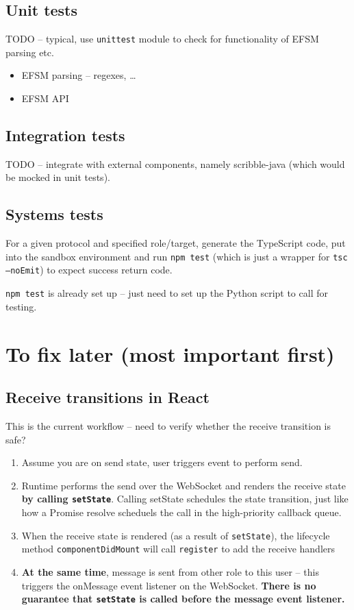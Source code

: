 \documentclass{article}
\begin{document}
\subsection{Unit tests}
TODO -- typical, use \texttt{unittest} module
to check for functionality of EFSM parsing
etc.

\begin{itemize}
\item EFSM parsing -- regexes, \dots
\item EFSM API
\end{itemize}

\subsection{Integration tests}
TODO -- integrate with external components, namely
scribble-java (which would be mocked in unit tests).

\subsection{Systems tests}
For a given protocol and specified role/target,
generate the TypeScript code, put into the
sandbox environment and run \texttt{npm test} 
(which is just a wrapper for 
\texttt{tsc --noEmit})
to expect success return code.

\texttt{npm test} is already set up -- just need to
set up the Python script to call for testing.

\section{To fix later (most important first)}

\subsection*{Receive transitions in React}
This is the current workflow -- need to verify whether the receive transition is safe?

\begin{enumerate}
\item
Assume you are on send state, user triggers
event to perform send.
\item
Runtime performs the send over the WebSocket
and renders the receive state \textbf{by
calling \texttt{setState}}. Calling setState 
schedules the state transition, just like
how a Promise resolve scheduels the call in
the high-priority callback queue.

\item When the receive state is rendered (as a 
result of \texttt{setState}), the lifecycle
method \texttt{componentDidMount} will call \texttt{register} to add the receive handlers 

\item \textbf{At the same time}, message is sent from
other role to this user -- this triggers the 
onMessage event listener on the WebSocket. 
\textbf{There is no guarantee that \texttt{setState} 
is called before the message event listener.}

\end{enumerate}
\end{document}
